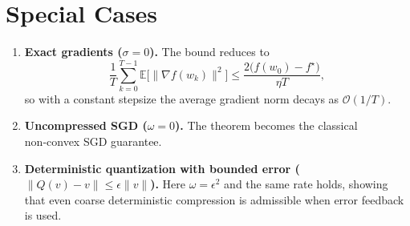 \documentclass{article}
\newcommand{\EE}{\mathbb{E}}
\begin{document}
\section*{Special Cases}
\begin{enumerate}[label=\alph*)]
\item \textbf{Exact gradients ($\sigma=0$).} The bound reduces to
\[
\frac{1}{T}\sum_{k=0}^{T-1}\EE\!\big[\|\nabla f(w_k)\|^{2}\big]
\le \frac{2\big(f(w_0)-f^{\star}\big)}{\eta T},
\]
so with a constant stepsize the average gradient norm decays as $\mathcal{O}(1/T)$.
\item \textbf{Uncompressed SGD ($\omega=0$).} The theorem becomes the classical non‑convex SGD guarantee.
\item \textbf{Deterministic quantization with bounded error ($\|Q(v)-v\|\le\epsilon\|v\|$).} Here $\omega=\epsilon^{2}$ and the same rate holds, showing that even coarse deterministic compression is admissible when error feedback is used.
\end{enumerate}
\end{document}
